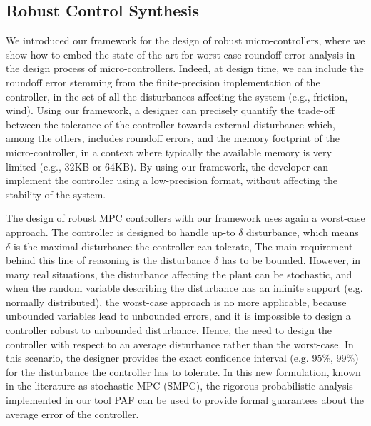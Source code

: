 \subsection{Robust Control Synthesis}
%
We introduced our framework for the design of robust micro-controllers, where we show how to embed the state-of-the-art for worst-case roundoff error analysis in the design process of micro-controllers.
%
Indeed, at design time, we can include the roundoff error stemming from the finite-precision implementation of the controller, in the set of all the disturbances affecting the system (e.g., friction, wind).
%
Using our framework, a designer can precisely quantify the trade-off between the tolerance of the controller towards external disturbance which, among the others, includes roundoff errors, and the memory footprint of the micro-controller, in a context where typically the available memory is very limited (e.g., 32KB or 64KB).
%
By using our framework, the developer can implement the controller using a low-precision format, without affecting the stability of the system.
%

The design of robust MPC controllers with our framework uses again a worst-case approach.
%
The controller is designed to handle up-to $\delta$ disturbance, which means $\delta$ is the maximal disturbance the controller can tolerate,
%
The main requirement behind this line of reasoning is the disturbance $\delta$ has to be bounded.
%
%
However, in many real situations, the disturbance affecting the plant can be stochastic, and when the random variable describing the disturbance has an infinite support (e.g. normally distributed), the worst-case approach is no more applicable, because unbounded variables lead to unbounded errors, and it is impossible to design a controller robust to unbounded disturbance.
%
Hence, the need to design the controller with respect to an average disturbance rather than the worst-case. In this scenario, the designer provides the exact confidence interval (e.g. 95\%, 99\%) for the disturbance the controller has to tolerate.
%
In this new formulation, known in the literature as stochastic MPC (SMPC), the rigorous probabilistic analysis implemented in our tool PAF can be used to provide formal guarantees about the average error of the controller.
%
%
%
